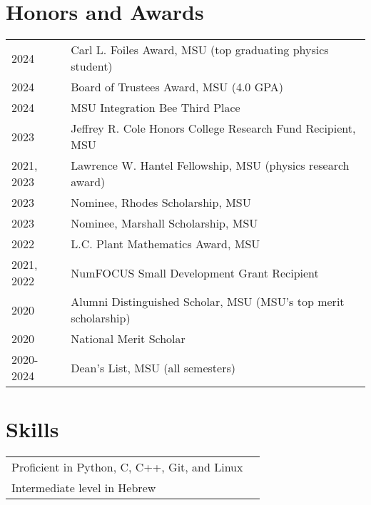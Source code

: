 \documentclass[letterpaper,12pt]{article}
\begin{document}
\section{Honors and Awards}

\begin{tabularx}{\linewidth}{@{}l X@{}}	
2024 & Carl L. Foiles Award, MSU (top graduating physics student) \\
2024 & Board of Trustees Award, MSU (4.0 GPA) \\
2024 & MSU Integration Bee Third Place \\
2023 & Jeffrey R. Cole Honors College Research Fund Recipient, MSU \\
2021, 2023 & Lawrence W. Hantel Fellowship, MSU (physics research award) \\
2023 & Nominee, Rhodes Scholarship, MSU \\
2023 & Nominee, Marshall Scholarship, MSU \\
2022 & L.C. Plant Mathematics Award, MSU \\
2021, 2022 & NumFOCUS Small Development Grant Recipient \\
2020 & Alumni Distinguished Scholar, MSU (MSU's top merit scholarship) \\
2020 & National Merit Scholar \\
2020-2024 & Dean's List, MSU (all semesters) \\
\end{tabularx}


\section{Skills}

\begin{tabularx}{\linewidth}{@{}l X@{}}
Proficient in Python, C, C++, Git, and Linux \\
Intermediate level in Hebrew \\  
\end{tabularx}

\vfill
{}
\end{document}
